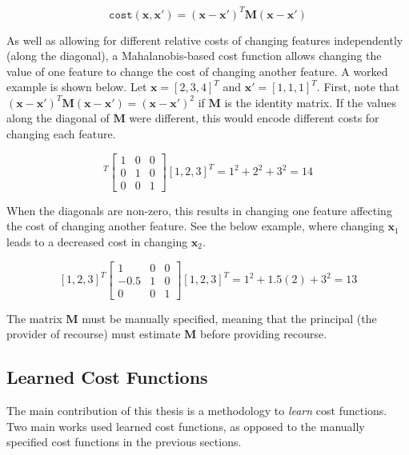 \begin{equation} \label{eq:mahalanobis_distance}
	\texttt{cost}(\mathbf{x}, \mathbf{x}') = (\mathbf{x} -\mathbf{x}')^T\mathbf{M}(\mathbf{x} - \mathbf{x}')
\end{equation}

As well as allowing for different relative costs of changing features independently (along the diagonal), a Mahalanobis-based cost function allows changing the value of one feature to change the cost of changing another feature. A worked example is shown below. Let $\mathbf{x} = [2,3,4]^T$ and $\mathbf{x}' = [1,1,1]^T$. First, note that $(\mathbf{x} -\mathbf{x}')^T\mathbf{M}(\mathbf{x} - \mathbf{x}') = (\mathbf{x} -\mathbf{x}')^2$ if $\mathbf{M}$ is the identity matrix. If the values along the diagonal of $\mathbf{M}$ were different, this would encode different costs for changing each feature.

\begin{equation}
	[1, 2, 3]^T \left[\begin{array}{lllll}
		1 & 0 & 0 \\
		0 & 1 & 0 \\
		0 & 0 & 1
	\end{array}\right] [1, 2, 3]^T = 1^2 + 2^2 + 3^2 = 14
\end{equation}

When the diagonals are non-zero, this results in changing one feature affecting the cost of changing another feature. See the below example, where changing $\mathbf{x}_1$ leads to a decreased cost in changing $\mathbf{x}_2$.

\begin{equation} \label{eq:mahalanobis_example}
	[1, 2, 3]^T \left[\begin{array}{lllll}
		1 & 0 & 0 \\
		-0.5 & 1 & 0 \\
		0 & 0 & 1
	\end{array}\right] [1, 2, 3]^T = 1^2 + 1.5(2) + 3^2 = 13
\end{equation}

The matrix $\mathbf{M}$ must be manually specified, meaning that the principal (the provider of recourse) must estimate $\mathbf{M}$ before providing recourse.

\subsection{Learned Cost Functions}

The main contribution of this thesis is a methodology to \textit{learn} cost functions. Two main works used learned cost functions, as opposed to the manually specified cost functions in the previous sections.\\

